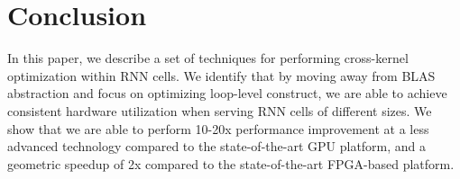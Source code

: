 \section{Conclusion}
\label{sec:conclusion}

In this paper, we describe a set of techniques for performing cross-kernel optimization within RNN cells.
We identify that by moving away from BLAS abstraction and focus on optimizing loop-level construct,
we are able to achieve consistent hardware utilization when serving RNN cells of different sizes.
We show that we are able to perform 10-20x performance improvement at a less advanced technology
compared to the state-of-the-art GPU platform, and a geometric speedup of 2x compared to the state-of-the-art FPGA-based platform.